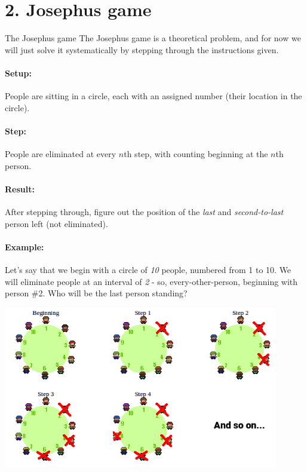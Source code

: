 \documentclass[a4paper,12pt]{book}
\begin{document}
    \section*{2. Josephus game}

        \begin{intro}{The Josephus game}
            The Josephus game is a theoretical problem, and for now we
            will just solve it systematically by stepping through the
            instructions given.

            \paragraph{Setup:} People are sitting in a circle, each with
            an assigned number (their location in the circle).

            \paragraph{Step:} People are eliminated at every $n$th step,
            with counting beginning at the $n$th person.

            \paragraph{Result:} After stepping through, figure out the
            position of the \textit{last} and \textit{second-to-last}
            person left (not eliminated).

            \paragraph{Example:} Let's say that we begin with a circle of
            \textit{10} people, numbered from 1 to 10. We will eliminate
            people at an interval of \textit{2} - so, every-other-person,
            beginning with person \#2. Who will be the last person standing?

            \includegraphics[width=12cm]{images/josephus.png}
        \end{intro}
\end{document}
